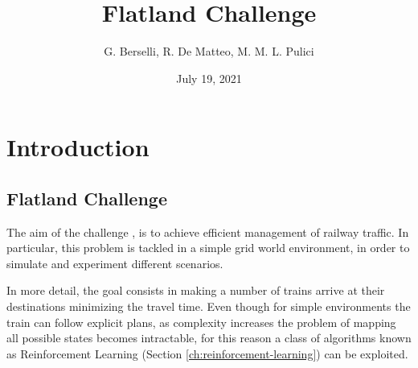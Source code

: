 \documentclass[a4paper, 12pt]{article}
\numberwithin{equation}{section}
\begin{document}
\title{Flatland Challenge}
\author{G. Berselli, R. De Matteo, M. M. L. Pulici}
\date{July 19, 2021}
\maketitle
\begin{center}
\end{center}


\clearpage

\tableofcontents

\clearpage


\section{Introduction}

\subsection{Flatland Challenge}

The aim of the challenge \cite{flatland}, is to achieve efficient management of railway traffic. In particular, this problem is tackled in a simple grid world environment, in order to simulate and experiment different scenarios.

In more detail, the goal consists in making a number of trains arrive at their destinations minimizing the travel time. Even though for simple environments the train can follow explicit plans, as complexity increases the problem of mapping all possible states becomes intractable, for this reason a class of algorithms known as Reinforcement Learning (Section \ref{ch:reinforcement-learning}) can be exploited.
\end{document}
